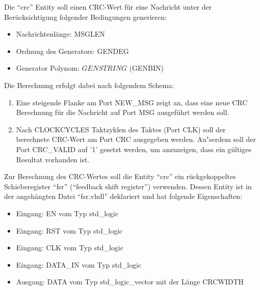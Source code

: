 \documentclass[a4paper,12pt]{article}
\begin{document}
Die "`crc"' Entity soll einen CRC-Wert f\"ur eine Nachricht unter der Ber\"ucksichtigung folgender Bedingungen generieren:
\begin{itemize}
\item Nachrichtenl\"ange: {{MSGLEN}}
\item Ordnung des Generators: {{GENDEG}}
\item Generator Polynom: ${{GENSTRING}}$ ({{GENBIN}})
\end{itemize}
Die Berechnung erfolgt dabei nach folgendem Schema:
\begin{enumerate}
    \item Eine steigende Flanke am Port NEW\_MSG zeigt an, dass eine neue CRC Berechnung f\"ur die Nachricht auf Port MSG ausgef\"uhrt werden soll.
    \item Nach {{CLOCKCYCLES}} Taktzyklen des Taktes (Port CLK) soll der berechnete CRC-Wert am Port CRC ausgegeben werden. Au"serdem soll der Port CRC\_VALID auf '1' gesetzt werden, um anzuzeigen, dass ein g\"ultiges Resultat vorhanden ist.
\end{enumerate}

\newpage

Zur Berechnung des CRC-Wertes soll die Entity "`crc"' ein r\"uckgekoppeltes Schieberegister "`fsr"' ("`feedback shift register"') verwenden. Dessen Entity ist in der angeh\"angten Datei "`fsr.vhdl"' deklariert und hat folgende Eigenschaften:
\begin{itemize}
    \item Eingang: EN vom Typ std\_logic
    \item Eingang: RST vom Typ std\_logic
    \item Eingang: CLK vom Typ std\_logic
    \item Eingang: DATA\_IN vom Typ std\_logic
    \item Ausgang: DATA vom Typ std\_logic\_vector mit der L\"ange {{CRCWIDTH}}
\end{itemize}

\vspace{0.5cm}
\end{document}
